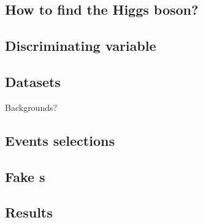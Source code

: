 \subsection*{How to find the Higgs boson?} 


\subsection*{Discriminating variable}


\subsection*{Datasets}


\begin{frame}
\begin{center}
\LARGE Backgrounds?
\end{center}
\end{frame}
\addtocounter{framenumber}{-1}



\subsection*{Events selections}


\subsection*{Fake \tauh s}


\subsection*{Results}
